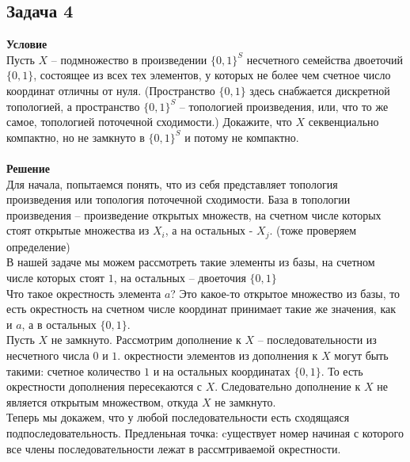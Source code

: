 		\subsection*{Задача 4}
		\textbf{Условие}\\
		Пусть $X$ -- подмножество в произведении $\{0, 1\}^S$ несчетного семейства двоеточий $\{0, 1\}$, состоящее из всех тех элементов, у которых не более чем счетное число координат отличны от нуля. (Пространство $\{0, 1\}$ здесь снабжается дискретной топологией, а пространство $\{0, 1\}^S$ -- топологией произведения, или, что то же самое, топологией поточечной сходимости.) Докажите, что $X$ секвенциально компактно, но не замкнуто в $\{0, 1\}^S$ и потому не компактно.\\
		\\
		\textbf{Решение}\\
		Для начала, попытаемся понять, что из себя представляет топология произведения или топология поточечной сходимости. База в топологии произведения -- произведение открытых множеств, на счетном числе которых стоят открытые множества из $X_i$, а на остальных - $X_j$. (тоже проверяем определение)\\		
		В нашей задаче мы можем рассмотреть такие элементы из базы, на счетном числе которых стоят $1$, на остальных -- двоеточия $\{0, 1\}$\\
		Что такое окрестность элемента $a$? Это какое-то открытое множество из базы, то есть окрестность на счетном числе координат принимает такие же значения, как и $a$, а в остальных $\{0, 1\}$.\\		
		Пусть $X$ не замкнуто. Рассмотрим дополнение к $X$ -- последовательности из несчетного числа $0$ и $1$. окрестности элементов из дополнения к $X$ могут быть такими: счетное количество $1$ и на остальных координатах $\{0, 1\}$. То есть окрестности дополнения пересекаются с $X$. Следовательно дополнение к $X$ не является открытым множеством, откуда $X$ не замкнуто.\\		
		Теперь мы докажем, что у любой последовательности есть сходящаяся подпоследовательность. Предленьная точка: cуществует номер начиная с которого все члены последовательности лежат в рассмтриваемой окрестности.\\
		
